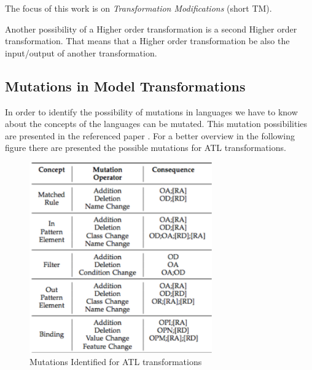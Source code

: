 \documentclass{llncs}
\begin{document}
The focus of this work is on \textit{Transformation Modifications} (short TM). 

Another possibility of a Higher order transformation is a second Higher order
transformation. That means that a Higher order transformation be also the
input/output of another transformation.

\subsection{Mutations in Model Transformations}
In order to identify the possibility of mutations in languages we have to know
about the concepts of the languages can be mutated. This mutation possibilities
are presented in the referenced paper \cite{troya:2015}. For a better overview
in the following figure there are presented the possible mutations for ATL
transformations.\label{fig:mutations_ATL}

 \begin{figure}[tb]
	\centering
	\includegraphics[width=0.7\textwidth,natwidth=610,natheight=642]{figures/Mutations_Identified_for_ATL.pdf}
	\caption{Mutations Identified for ATL transformations}
	\label{fig:mutations_ATL}
\end{figure}~\cite{troya:2015}
\end{document}
